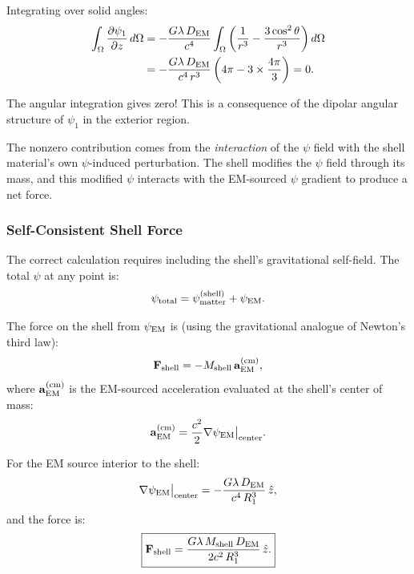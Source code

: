 \documentclass[aps,prd,twocolumn,superscriptaddress,floatfix,nofootinbib]{revtex4-2}
\newcommand{\avec}{\mathbf{a}}
\newcommand{\lam}{\lambda}
\begin{document}
Integrating over solid angles:
\begin{align}
\int_\Omega\frac{\partial\psi_1}{\partial z}\,d\Omega
&= -\frac{G\lam\,D_{\rm EM}}{c^4}
\int_\Omega\left(\frac{1}{r^3} - \frac{3\cos^2\theta}{r^3}\right)d\Omega
\notag\\
&= -\frac{G\lam\,D_{\rm EM}}{c^4\,r^3}
\left(4\pi - 3 \times \frac{4\pi}{3}\right) = 0.
\end{align}

The angular integration gives zero! This is a consequence of the
dipolar angular structure of $\psi_1$ in the exterior region.

The nonzero contribution comes from the \emph{interaction} of the
$\psi$ field with the shell material's own $\psi$-induced
perturbation. The shell modifies the $\psi$ field through its
mass, and this modified $\psi$ interacts with the EM-sourced
$\psi$ gradient to produce a net force.

\subsubsection{Self-Consistent Shell Force}

The correct calculation requires including the shell's gravitational
self-field. The total $\psi$ at any point is:
\begin{equation}
\psi_{\rm total} = \psi_{\rm matter}^{(\rm shell)}
+ \psi_{\rm EM}.
\end{equation}

The force on the shell from $\psi_{\rm EM}$ is (using the
gravitational analogue of Newton's third law):
\begin{equation}
\mathbf{F}_{\rm shell} = -M_{\rm shell}\,\avec_{\rm EM}^{(\rm cm)},
\label{eq:shell-force-cm}
\end{equation}
where $\avec_{\rm EM}^{(\rm cm)}$ is the EM-sourced acceleration
evaluated at the shell's center of mass:
\begin{equation}
\avec_{\rm EM}^{(\rm cm)}
= \frac{c^2}{2}\nabla\psi_{\rm EM}\big|_{\rm center}.
\end{equation}

For the EM source interior to the shell:
\begin{equation}
\nabla\psi_{\rm EM}\big|_{\rm center}
= -\frac{G\lam\,D_{\rm EM}}{c^4\,R_1^3}\,\hat{z},
\end{equation}
and the force is:
\begin{equation}
\boxed{
\mathbf{F}_{\rm shell} = \frac{G\lam\,M_{\rm shell}\,D_{\rm EM}}
{2c^2\,R_1^3}\,\hat{z}.
}
\label{eq:shell-force-final}
\end{equation}
\end{document}
